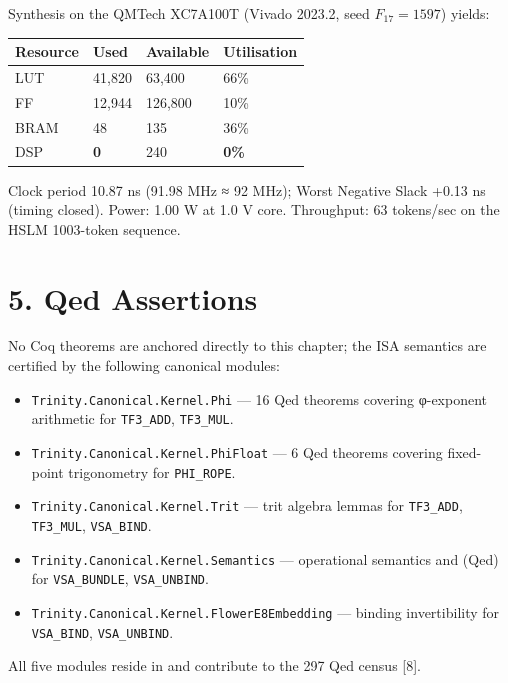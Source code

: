 Synthesis on the QMTech XC7A100T (Vivado 2023.2,
seed \(F_{17}=1597\)) yields:

\begin{longtable}[]{@{}llll@{}}
\toprule\noalign{}
Resource & Used & Available & Utilisation \\
\midrule\noalign{}
\endhead
\bottomrule\noalign{}
\endlastfoot
LUT & 41,820 & 63,400 & 66\% \\
FF & 12,944 & 126,800 & 10\% \\
BRAM & 48 & 135 & 36\% \\
DSP & \textbf{0} & 240 & \textbf{0\%} \\
\end{longtable}

Clock period 10.87 ns (91.98 MHz ≈ 92 MHz); Worst
Negative Slack +0.13 ns (timing closed). Power:
1.00 W at 1.0 V core. Throughput: 63 tokens/sec on
the HSLM 1003-token sequence.

\section{5. Qed
Assertions}\label{fa_26:qed-assertions}

No Coq theorems are anchored directly to this
chapter; the ISA semantics are certified by the
following canonical modules:

\begin{itemize}
\tightlist
\item
  \texttt{Trinity.Canonical.Kernel.Phi} --- 16 Qed
  theorems covering φ-exponent arithmetic for
  \texttt{TF3\_ADD}, \texttt{TF3\_MUL}.
\item
  \texttt{Trinity.Canonical.Kernel.PhiFloat} --- 6
  Qed theorems covering fixed-point trigonometry
  for \texttt{PHI\_ROPE}.
\item
  \texttt{Trinity.Canonical.Kernel.Trit} --- trit
  algebra lemmas for \texttt{TF3\_ADD},
  \texttt{TF3\_MUL}, \texttt{VSA\_BIND}.
\item
  \texttt{Trinity.Canonical.Kernel.Semantics} ---
  operational semantics and
   (Qed) for
  \texttt{VSA\_BUNDLE}, \texttt{VSA\_UNBIND}.
\item
  \texttt{Trinity.Canonical.Kernel.FlowerE8Embedding}
  --- binding invertibility for
  \texttt{VSA\_BIND}, \texttt{VSA\_UNBIND}.
\end{itemize}

All five modules reside in
 and
contribute to the 297 Qed census [8].

